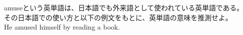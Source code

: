 \documentclass{jarticle}
\begin{document}
\vspace*{\fill}
\begin{center}
amuseという英単語は、日本語でも外来語として使われている英単語である。\\
その日本語での使い方と以下の例文をもとに、英単語の意味を推測せよ。\\
He amused himself by reading a book.
\end{center}
\vspace*{\fill}
\end{document}
